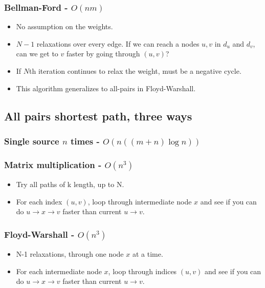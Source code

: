\subsubsection{Bellman-Ford - $O(nm)$}
\begin{itemize}
    \item No assumption on the weights.
    \item $N-1$ relaxations over every edge. If we can reach a nodes $u,v$ in $d_u$ and $d_v$, can we get to $v$ faster by going through $(u,v)$?
    \item If $N$th iteration continues to relax the weight, must be a negative cycle.
    \item This algorithm generalizes to all-pairs in Floyd-Warshall.
\end{itemize}
\subsection{All pairs shortest path, three ways}
\subsubsection{Single source $n$ times - $O(n((m + n)\log n))$}
\subsubsection{Matrix multiplication - $O(n^3)$}
\begin{itemize}
    \item Try all paths of k length, up to N.
    \item For each index $(u,v)$, loop through intermediate node $x$ and see if you can do $u\to x\to v$ faster than current $u\to v$.
\end{itemize}
\subsubsection{Floyd-Warshall - $O(n^3)$}
\begin{itemize}
    \item N-1 relaxations, through one node $x$ at a time.
    \item For each intermediate node $x$, loop through indices $(u,v)$ and see if you can do $u\to x\to v$ faster than current $u\to v$.
\end{itemize}

